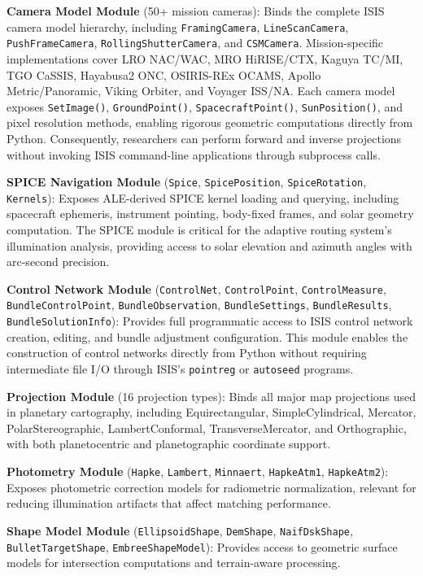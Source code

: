 \documentclass[lettersize,journal]{IEEEtran}
\begin{document}
\textbf{Camera Model Module} (50+ mission cameras): Binds the complete ISIS camera model hierarchy, including \texttt{FramingCamera}, \texttt{LineScanCamera}, \texttt{PushFrameCamera}, \texttt{RollingShutterCamera}, and \texttt{CSMCamera}. Mission-specific implementations cover LRO NAC/WAC, MRO HiRISE/CTX, Kaguya TC/MI, TGO CaSSIS, Hayabusa2 ONC, OSIRIS-REx OCAMS, Apollo Metric/Panoramic, Viking Orbiter, and Voyager ISS/NA. Each camera model exposes \texttt{SetImage()}, \texttt{GroundPoint()}, \texttt{SpacecraftPoint()}, \texttt{SunPosition()}, and pixel resolution methods, enabling rigorous geometric computations directly from Python. Consequently, researchers can perform forward and inverse projections without invoking ISIS command-line applications through subprocess calls.

\textbf{SPICE Navigation Module} (\texttt{Spice}, \texttt{SpicePosition}, \texttt{SpiceRotation}, \texttt{Kernels}): Exposes ALE-derived SPICE kernel loading and querying, including spacecraft ephemeris, instrument pointing, body-fixed frames, and solar geometry computation. The SPICE module is critical for the adaptive routing system's illumination analysis, providing access to solar elevation and azimuth angles with arc-second precision.

\textbf{Control Network Module} (\texttt{ControlNet}, \texttt{ControlPoint}, \texttt{ControlMeasure}, \texttt{BundleControlPoint}, \texttt{BundleObservation}, \texttt{BundleSettings}, \texttt{BundleResults}, \texttt{BundleSolutionInfo}): Provides full programmatic access to ISIS control network creation, editing, and bundle adjustment configuration. This module enables the construction of control networks directly from Python without requiring intermediate file I/O through ISIS's \texttt{pointreg} or \texttt{autoseed} programs.

\textbf{Projection Module} (16 projection types): Binds all major map projections used in planetary cartography, including Equirectangular, SimpleCylindrical, Mercator, PolarStereographic, LambertConformal, TransverseMercator, and Orthographic, with both planetocentric and planetographic coordinate support.

\textbf{Photometry Module} (\texttt{Hapke}, \texttt{Lambert}, \texttt{Minnaert}, \texttt{HapkeAtm1}, \texttt{HapkeAtm2}): Exposes photometric correction models for radiometric normalization, relevant for reducing illumination artifacts that affect matching performance.

\textbf{Shape Model Module} (\texttt{EllipsoidShape}, \texttt{DemShape}, \texttt{NaifDskShape}, \texttt{BulletTargetShape}, \texttt{EmbreeShapeModel}): Provides access to geometric surface models for intersection computations and terrain-aware processing.
\end{document}
